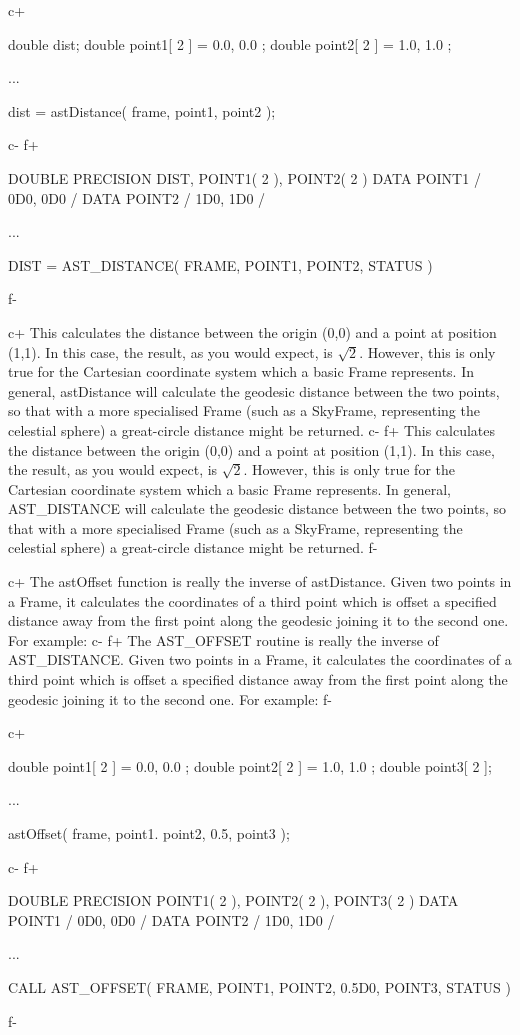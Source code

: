 \documentclass[twoside,11pt]{starlink}
\begin{document}
c+
\small
\begin{terminalv}
double dist;
double point1[ 2 ] = { 0.0, 0.0 };
double point2[ 2 ] = { 1.0, 1.0 };

...

dist = astDistance( frame, point1, point2 );
\end{terminalv}
\normalsize
c-
f+
\small
\begin{terminalv}
      DOUBLE PRECISION DIST, POINT1( 2 ), POINT2( 2 )
      DATA POINT1 / 0D0, 0D0 /
      DATA POINT2 / 1D0, 1D0 /

      ...

      DIST = AST_DISTANCE( FRAME, POINT1, POINT2, STATUS )
\end{terminalv}
\normalsize
f-

c+
This calculates the distance between the origin (0,0) and a point at
position (1,1). In this case, the result, as you would expect, is
$\surd{2}$. However, this is only true for the Cartesian coordinate
system which a basic Frame represents. In general, astDistance will
calculate the geodesic distance between the two points, so that with a
more specialised Frame (such as a SkyFrame, representing the celestial
sphere) a great-circle distance might be returned.
c-
f+
This calculates the distance between the origin (0,0) and a point at
position (1,1). In this case, the result, as you would expect, is
$\surd{2}$. However, this is only true for the Cartesian coordinate
system which a basic Frame represents. In general, AST\_DISTANCE will
calculate the geodesic distance between the two points, so that with a
more specialised Frame (such as a SkyFrame, representing the celestial
sphere) a great-circle distance might be returned.
f-

c+
The astOffset function is really the inverse of astDistance. Given two
points in a Frame, it calculates the coordinates of a third point
which is offset a specified distance away from the first point along
the geodesic joining it to the second one. For example:
c-
f+
The AST\_OFFSET routine is really the inverse of AST\_DISTANCE. Given
two points in a Frame, it calculates the coordinates of a third point
which is offset a specified distance away from the first point along
the geodesic joining it to the second one. For example:
f-

c+
\small
\begin{terminalv}
double point1[ 2 ] = { 0.0, 0.0 };
double point2[ 2 ] = { 1.0, 1.0 };
double point3[ 2 ];

...

astOffset( frame, point1. point2, 0.5, point3 );
\end{terminalv}
\normalsize
c-
f+
\small
\begin{terminalv}
      DOUBLE PRECISION POINT1( 2 ), POINT2( 2 ), POINT3( 2 )
      DATA POINT1 / 0D0, 0D0 /
      DATA POINT2 / 1D0, 1D0 /

      ...

      CALL AST_OFFSET( FRAME, POINT1, POINT2, 0.5D0, POINT3, STATUS )
\end{terminalv}
\normalsize
f-
\end{document}
